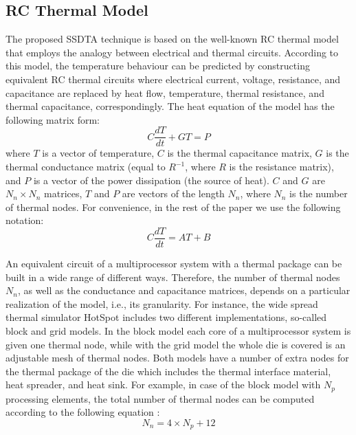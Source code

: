 \subsection{RC Thermal Model}
The proposed SSDTA technique is based on the well-known RC thermal model that employs the analogy between electrical and thermal circuits. According to this model, the temperature behaviour can be predicted by constructing equivalent RC thermal circuits where electrical current, voltage, resistance, and capacitance are replaced by heat flow, temperature, thermal resistance, and thermal capacitance, correspondingly. The heat equation of the model has the following matrix form:
\begin{equation} \label{eq:thermal-ode}
  C \frac{dT}{dt} + G T = P
\end{equation}
where $T$ is a vector of temperature, $C$ is the thermal capacitance matrix, $G$ is the thermal conductance matrix (equal to $R^{-1}$, where $R$ is the resistance matrix), and $P$ is a vector of the power dissipation (the source of heat). $C$ and $G$ are $N_n \times N_n$ matrices, $T$ and $P$ are vectors of the length $N_n$, where $N_n$ is the number of thermal nodes. For convenience, in the rest of the paper we use the following notation:
\begin{equation} \label{eq:initial}
  C \frac{dT}{dt} = A T + B
\end{equation}

An equivalent circuit of a multiprocessor system with a thermal package can be built in a wide range of different ways. Therefore, the number of thermal nodes $N_n$, as well as the conductance and capacitance matrices, depends on a particular realization of the model, i.e., its granularity. For instance, the wide spread thermal simulator HotSpot \cite{huang2006} includes two different implementations, so-called block and grid models. In the block model each core of a multiprocessor system is given one thermal node, while with the grid model the whole die is covered is an adjustable mesh of thermal nodes. Both models have a number of extra nodes for the thermal package of the die which includes the thermal interface material, heat spreader, and heat sink. For example, in case of the block model with $N_p$ processing elements, the total number of thermal nodes can be computed according to the following equation \cite{rao2008}:
\begin{equation} \label{eq:nodes}
  N_n = 4 \times N_p + 12
\end{equation}

